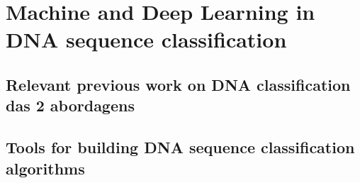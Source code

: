 \chapter{Machine and Deep Learning in DNA sequence classification} \label{sec:ml_dl_dna}

\section{Relevant previous work on DNA classification das 2 abordagens}


\section{Tools for building DNA sequence classification algorithms}


